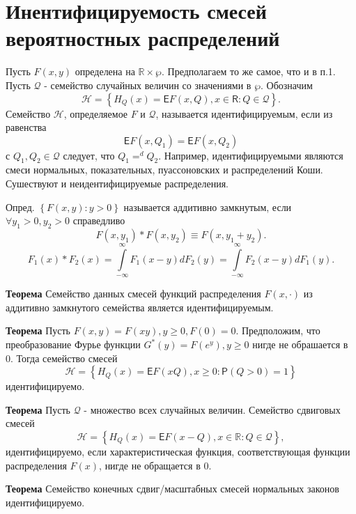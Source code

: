 \documentclass[11pt]{article}
\begin{document}
\section{Инентифицируемость смесей вероятностных распределений}
Пусть $F(x,y)$ определена на $\mathbb{R} \times \wp$. Предполагаем то же самое, что и в п.1. \\
Пусть $\mathcal{Q}$ - семейство случайных величин со значениями в $\wp$. Обозначим
$$
\mathcal{H} = \left\{ H_Q(x) = \mathsf{E}F(x, Q), x \in \mathsf{R} : Q \in \mathcal{Q} \right\}.
$$
Семейство $\mathcal{H}$, определяемое $F$ и $\mathcal{Q}$, называется идентифицируемым, если из равенства
$$
\mathsf{E}F(x, Q_1) = \mathsf{E}F(x, Q_2)
$$
с $Q_1, Q_2 \in \mathcal{Q}$ следует, что $Q_1 =^d Q_2$.
Например, идентифицируемыми являются смеси нормальных, показательных, пуассоновских и распределений Коши. Сушествуют и неидентифицируемые распределения.

Опред. $\left\{ F(x, y) : y > 0 \right\}$ называется аддитивно замкнутым, если $\forall y_1 > 0, y_2 > 0$ справедливо
$$
F(x, y_1) \ast F(x, y_2) \equiv F(x, y_1 + y_2).
$$
$$
F_1(x) \ast F_2(x) = \int\limits_{-\infty}^{\infty} F_1(x - y)dF_2(y) = \int\limits_{-\infty}^{\infty} F_2(x - y)dF_1(y).
$$

\textbf{Теорема} Семейство данных смесей функций распределения $F(x, \cdot)$ из аддитивно замкнутого семейства является идентифицируемым.

\textbf{Теорема} Пусть $F(x, y) = F(xy), y \geqslant 0, F(0) = 0$. Предположим, что преобразование Фурье функции $G^{*}(y) = F(e^y), y \geqslant 0$ нигде не обрашается в 0. Тогда семейство смесей
$$
\mathcal{H} = \left\{ H_Q(x) = \mathsf{E}F(xQ), x \geqslant 0 : \mathsf{P}(Q > 0) = 1 \right\} 
$$
идентифицируемо.

\textbf{Теорема} Пусть $\mathcal{Q}$ - множество всех случайных величин. Семейство сдвиговых смесей
$$
\mathcal{H} = \left\{ H_Q(x) = \mathsf{E}F(x - Q), x \in \mathbb{R} : Q \in \mathcal{Q} \right\},
$$
идентифицируемо, если характеристическая функция, соответствующая функции распределения $F(x)$, нигде не обращается в 0.

\textbf{Теорема} Семейство конечных сдвиг/масштабных смесей нормальных законов идентифицируемо.
\end{document}
